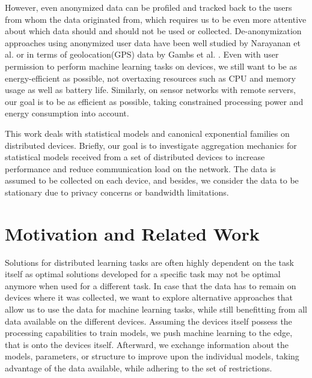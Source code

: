 However, even anonymized data can be profiled and tracked back to the users from whom the data originated from, which requires us to be even more attentive about which data should and should not be used or collected. 
De-anonymization approaches using anonymized user data have been well studied by Narayanan et al. \cite{narayanan2008robust} or in terms of geolocation(GPS) data by Gambs et al. \cite{gambs2014anonymization}.
Even with user permission to perform machine learning tasks on devices, we still want to be as energy-efficient as possible, not overtaxing resources such as CPU and memory usage as well as battery life.
Similarly, on sensor networks with remote servers, our goal is to be as efficient as possible, taking constrained processing power and energy consumption into account.

This work deals with statistical models and canonical exponential families on distributed devices.
Briefly,  our goal is to investigate aggregation mechanics for statistical models received from a set of distributed devices to increase performance and reduce communication load on the network.
The data is assumed to be collected on each device, and besides, we consider the data to be stationary due to privacy concerns or bandwidth limitations.

\section{Motivation and Related Work}
 
Solutions for distributed learning tasks are often highly dependent on the task itself as optimal solutions developed for a specific task may not be optimal anymore when used for a different task.
In case that the data has to remain on devices where it was collected, we want to explore alternative approaches that allow us to use the data for machine learning tasks, while still benefitting from all data available on the different devices.
Assuming the devices itself possess the processing capabilities to train models, we push machine learning to the edge, that is onto the devices itself.
Afterward, we exchange information about the models, parameters, or structure to improve upon the individual models, taking advantage of the data available, while adhering to the set of restrictions.

